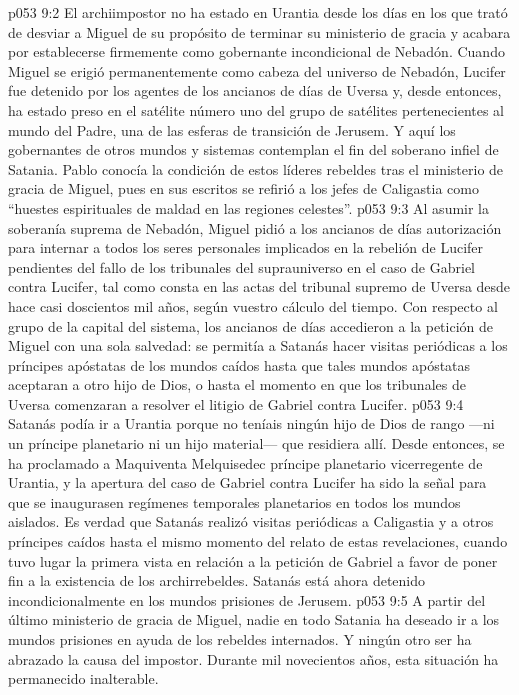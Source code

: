 \vs p053 9:2 \pc El archiimpostor no ha estado en Urantia desde los días en los que trató de desviar a Miguel de su propósito de terminar su ministerio de gracia y acabara por establecerse firmemente como gobernante incondicional de Nebadón. Cuando Miguel se erigió permanentemente como cabeza del universo de Nebadón, Lucifer fue detenido por los agentes de los ancianos de días de Uversa y, desde entonces, ha estado preso en el satélite número uno del grupo de satélites pertenecientes al mundo del Padre, una de las esferas de transición de Jerusem. Y aquí los gobernantes de otros mundos y sistemas contemplan el fin del soberano infiel de Satania. Pablo conocía la condición de estos líderes rebeldes tras el ministerio de gracia de Miguel, pues en sus escritos se refirió a los jefes de Caligastia como “huestes espirituales de maldad en las regiones celestes”.
\vs p053 9:3 \pc Al asumir la soberanía suprema de Nebadón, Miguel pidió a los ancianos de días autorización para internar a todos los seres personales implicados en la rebelión de Lucifer pendientes del fallo de los tribunales del suprauniverso en el caso de Gabriel contra Lucifer, tal como consta en las actas del tribunal supremo de Uversa desde hace casi doscientos mil años, según vuestro cálculo del tiempo. Con respecto al grupo de la capital del sistema, los ancianos de días accedieron a la petición de Miguel con una sola salvedad: se permitía a Satanás hacer visitas periódicas a los príncipes apóstatas de los mundos caídos hasta que tales mundos apóstatas aceptaran a otro hijo de Dios, o hasta el momento en que los tribunales de Uversa comenzaran a resolver el litigio de Gabriel contra Lucifer.
\vs p053 9:4 Satanás podía ir a Urantia porque no teníais ningún hijo de Dios de rango ---ni un príncipe planetario ni un hijo material--- que residiera allí. Desde entonces, se ha proclamado a Maquiventa Melquisedec príncipe planetario vicerregente de Urantia, y la apertura del caso de Gabriel contra Lucifer ha sido la señal para que se inaugurasen regímenes temporales planetarios en todos los mundos aislados. Es verdad que Satanás realizó visitas periódicas a Caligastia y a otros príncipes caídos hasta el mismo momento del relato de estas revelaciones, cuando tuvo lugar la primera vista en relación a la petición de Gabriel a favor de poner fin a la existencia de los archirrebeldes. Satanás está ahora detenido incondicionalmente en los mundos prisiones de Jerusem.
\vs p053 9:5 \pc A partir del último ministerio de gracia de Miguel, nadie en todo Satania ha deseado ir a los mundos prisiones en ayuda de los rebeldes internados. Y ningún otro ser ha abrazado la causa del impostor. Durante mil novecientos años, esta situación ha permanecido inalterable.
